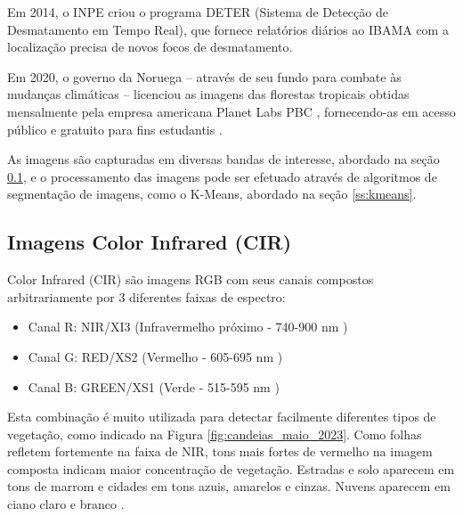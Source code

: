\documentclass[11pt]{article}
\begin{document}



Em 2014, o INPE criou o programa DETER (Sistema de Detecção de Desmatamento em Tempo Real), que fornece relatórios diários ao IBAMA com a localização precisa de novos focos de desmatamento.

Em 2020, o governo da Noruega -- através de seu fundo para combate às mudanças climáticas -- licenciou as imagens das florestas tropicais obtidas mensalmente pela empresa americana Planet Labs PBC \cite{noruega:2020}, fornecendo-as em acesso público e gratuito para fins estudantis \cite{planet:2020}.

As imagens são capturadas em diversas bandas de interesse, abordado na seção \ref{ss:cir}, e o processamento das imagens pode ser efetuado através de algoritmos de segmentação de imagens, como o K-Means, abordado na seção \ref{ss:kmeans}.


\subsection{Imagens Color Infrared (CIR)}
\label{ss:cir}

Color Infrared (CIR) são imagens RGB com seus canais compostos arbitrariamente por 3 diferentes faixas de espectro:

\begin{itemize}
	\item Canal R: NIR/XI3 (Infravermelho próximo - 740-900 nm \cite{skysat:2022})
	\item Canal G: RED/XS2 (Vermelho - 605-695 nm \cite{skysat:2022})
	\item Canal B: GREEN/XS1 (Verde - 515-595 nm \cite{skysat:2022})
\end{itemize}

Esta combinação é muito utilizada para detectar facilmente diferentes tipos de vegetação, como indicado na Figura \ref{fig:candeias_maio_2023}. Como folhas refletem fortemente na faixa de NIR, tons mais fortes de vermelho na imagem composta indicam maior concentração de vegetação. Estradas e solo aparecem em tons de marrom e cidades em tons azuis, amarelos e cinzas. Nuvens aparecem em ciano claro e branco \cite{eos:cir:2023}.
\end{document}
